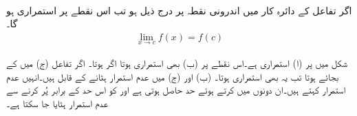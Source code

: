 \\
اگر تفاعل  کے دائرہ کار میں اندرونی نقطہ  پر درج ذیل ہو تب اس نقطے  پر  استمراری ہو گا۔
\begin{align*}
\lim_{x\to c}f(x)=f(c)
\end{align*}

شکل  میں  پر (ا) استمراری ہے۔اس نقطے پر (ب) بھی استمراری ہوتا اگر  ہوتا۔  اگر تفاعل (ج) میں  کے بجائے  ہوتا تب یہ بھی استمراری ہوتا۔ (ب) اور (ج) میں عدم استمرار ہٹانے کے قابل ہیں۔انہیں  عدم استمرار کہتے ہیں۔ان دونوں میں  کرتے ہوئے حد حاصل ہوتی ہے اور  کو اس حد کے برابر پُر کرنے  سے عدم استمرار ہٹایا جا سکتا ہے۔ 
